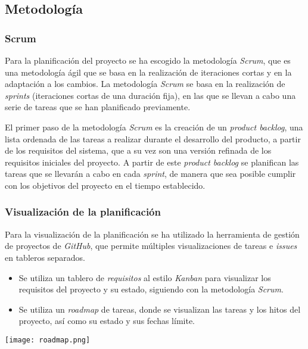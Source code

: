 \subsection{Metodología}\label{subsec:metodología}
\subsubsection{Scrum}
Para la planificación del proyecto se ha escogido la metodología \textit{Scrum}, que es una
metodología ágil que se basa en la realización de iteraciones cortas y en la adaptación a los
cambios. La metodología \textit{Scrum} se basa en la realización de \textit{sprints} (iteraciones
cortas de una duración fija), en las que se llevan a cabo una serie de tareas que se han
planificado previamente.

El primer paso de la metodología \textit{Scrum} es la creación de un \textit{product backlog},
una lista ordenada de las tareas a realizar durante el desarrollo del producto, a partir de los
requisitos del sistema, que a su vez son una versión refinada de los requisitos iniciales del
proyecto. A partir de este \textit{product backlog} se planifican las tareas que se llevarán
a cabo en cada \textit{sprint}, de manera que sea posible cumplir con los objetivos del proyecto
en el tiempo establecido.

\subsubsection{Visualización de la planificación}
Para la visualización de la planificación se ha utilizado la herramienta de gestión de proyectos
de \textit{GitHub}, que permite múltiples visualizaciones de tareas e \textit{issues} en tableros
separados.

\begin{itemize}
	\item Se utiliza un tablero de \textit{requisitos} al estilo \textit{Kanban} para visualizar
		los requisitos del proyecto y su estado, siguiendo con la metodología \textit{Scrum}.
	\item Se utiliza un \textit{roadmap} de tareas, donde se visualizan las tareas y los hitos
		del proyecto, así como su estado y sus fechas límite.
\end{itemize}

\begin{minipage}{\linewidth}
	\texttt{[image: roadmap.png]}
\end{minipage}

